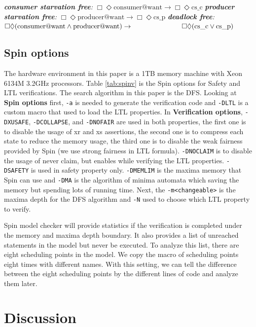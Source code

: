 {\smallbreak\indent\textit{\textbf{consumer starvation free}: $\Box\Diamond\text{consumer@want} \rightarrow\Box\Diamond\text{cs\_c}$}}
{\indent\textit{\textbf{producer starvation free}: $\Box\Diamond\text{producer@want} \rightarrow\Box\Diamond\text{cs\_p}$}}
{\indent\textit{\textbf{deadlock free}: $\Box\Diamond(\text{consumer@want}\wedge\text{producer@want})\rightarrow\hspace*{2.5cm}\Box\Diamond(\text{cs\_c}\vee\text{cs\_p})$}}

\subsection{Spin options}

The hardware environment in this paper is a 1TB memory machine with Xeon 6134M 3.2GHz processors. Table \ref{tab:spinv} is the Spin options for Safety and LTL verifications. The search algorithm in this paper is the DFS. Looking at \textbf{Spin options} first, \texttt{-a} is needed to generate the verification code and \texttt{-DLTL} is a custom macro that used to load the LTL properties. In \textbf{Verification options}, \texttt{-DXUSAFE}, \texttt{-DCOLLAPSE}, and \texttt{-DNOFAIR} are used in both properties, the first one is to disable the usage of xr and xs assertions, the second one is to compress each state to reduce the memory usage, the third one is to disable the weak fairness provided by Spin (we use strong fairness in LTL formula). \texttt{-DNOCLAIM} is to disable the usage of never claim, but enables while verifying the LTL properties. \texttt{-DSAFETY} is used in safety property only. \texttt{-DMEMLIM} is the maxima memory that Spin can use and \texttt{-DMA} is the algorithm of minima automata which saving the memory but spending lots of running time. Next, the \texttt{-m<changeable>} is the maxima depth for the DFS algorithm and \texttt{-N} used to choose which LTL property to verify.

Spin model checker will provide statistics if the verification is completed under the memory and maxima depth boundary. It also provides a list of unreached statements in the model but never be executed. To analyze this list, there are eight scheduling points in the model. We copy the macro of scheduling points eight times with different names. With this setting, we can tell the difference between the eight scheduling points by the different lines of code and analyze them later.

\section{Discussion}

